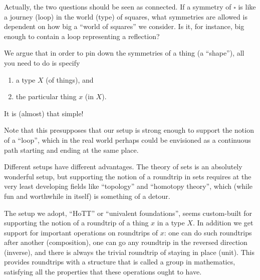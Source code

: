 Actually, the two questions should be seen as connected. 
If a symmetry of $\square$ is like a  journey (loop) 
in the world (type) of squares, what symmetries are allowed is 
dependent on how big a ``world of squares'' we consider. 
Is it, for instance, big enough to contain a loop representing a reflection?

We argue that in order to pin down the symmetries of a thing (a ``shape''), all you need to do is specify
\begin{enumerate}
\item a type $X$ (of things), and
\item the particular thing $x$ (in $X$).
\end{enumerate}
It is (almost) that simple!

Note that this presupposes that our setup is strong enough to support the
notion of a ``loop'', 
which in the  real world perhaps could be envisioned as a continuous path starting and ending at the same place.


Different setups have different advantages.
The theory of sets is an absolutely wonderful setup, but supporting the
notion of a roundtrip in sets requires at the very least developing fields
like ``topology'' and ``homotopy theory'', 
which (while fun and worthwhile in itself) is something of a detour.

The setup we adopt, ``HoTT'' or ``univalent foundations'', 
seems custom-built for supporting the notion of a roundtrip of
a thing $x$ in a type $X$. 
In addition we get support for important operations on roundtrips
of $x$: one can do such roundtrips after another (composition),
one can go any roundtrip in the reversed direction (inverse), and there
is always the trivial roundtrip of staying in place (unit).
This provides roundtrips with a structure that is called a group
in mathematics, satisfying all the properties that these operations
ought to have. 


